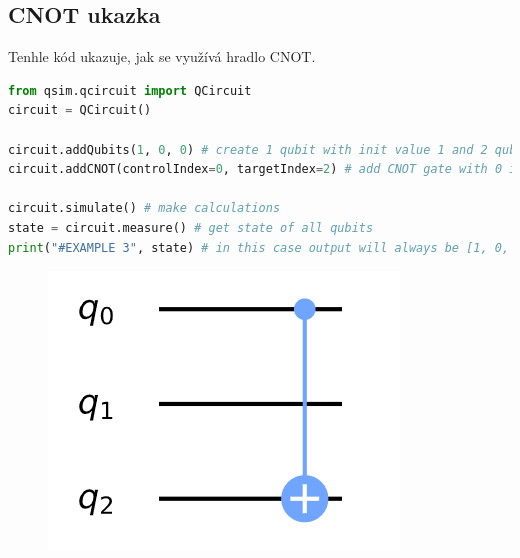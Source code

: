 \documentclass[11pt]{article}
\begin{document}
\subsection{CNOT ukazka}
Tenhle kód ukazuje, jak se využívá hradlo CNOT.
\begin{lstlisting}[language=Python, caption=CNOT example]
from qsim.qcircuit import QCircuit
circuit = QCircuit()

circuit.addQubits(1, 0, 0) # create 1 qubit with init value 1 and 2 qubits with init value 0
circuit.addCNOT(controlIndex=0, targetIndex=2) # add CNOT gate with 0 index qubit as control and 2 index as target

circuit.simulate() # make calculations
state = circuit.measure() # get state of all qubits
print("#EXAMPLE 3", state) # in this case output will always be [1, 0, 1]
\end{lstlisting}
\begin{figure}[H]
    \includegraphics[scale=.5]{cnot_scheme}
    \centering
\end{figure}
\end{document}
